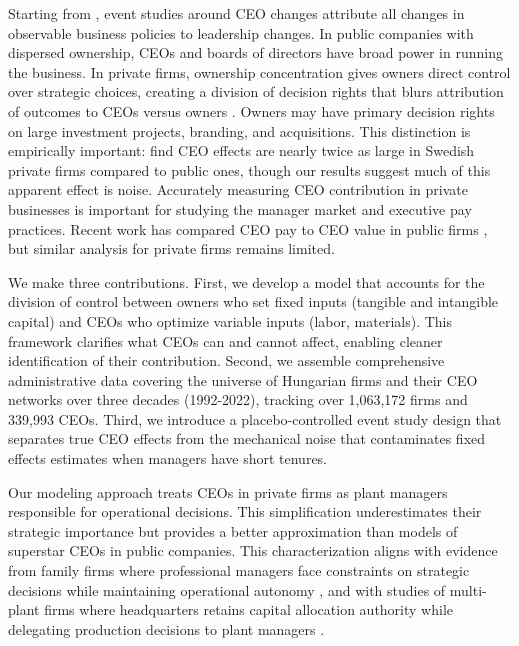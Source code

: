 \documentclass[11pt,a4paper]{article}
\begin{document}
Starting from \citet{Bertrand2003-io}, event studies around CEO changes attribute all changes in observable business policies to leadership changes. In public companies with dispersed ownership, CEOs and boards of directors have broad power in running the business. In private firms, ownership concentration gives owners direct control over strategic choices, creating a division of decision rights that blurs attribution of outcomes to CEOs versus owners \citep{fama1983separation, jensen1976theory, burkart2003family}. Owners may have primary decision rights on large investment projects, branding, and acquisitions. This distinction is empirically important: \citet{quigley2022ceo} find CEO effects are nearly twice as large in Swedish private firms compared to public ones, though our results suggest much of this apparent effect is noise. Accurately measuring CEO contribution in private businesses is important for studying the manager market and executive pay practices. Recent work has compared CEO pay to CEO value in public firms \citep{tervio2008difference,gabaix2008ceo}, but similar analysis for private firms remains limited.

We make three contributions. First, we develop a model that accounts for the division of control between owners who set fixed inputs (tangible and intangible capital) and CEOs who optimize variable inputs (labor, materials). This framework clarifies what CEOs can and cannot affect, enabling cleaner identification of their contribution. Second, we assemble comprehensive administrative data covering the universe of Hungarian firms and their CEO networks over three decades (1992-2022), tracking over 1,063,172 firms and 339,993 CEOs. Third, we introduce a placebo-controlled event study design that separates true CEO effects from the mechanical noise that contaminates fixed effects estimates when managers have short tenures.

Our modeling approach treats CEOs in private firms as plant managers responsible for operational decisions. This simplification underestimates their strategic importance but provides a better approximation than models of superstar CEOs in public companies. This characterization aligns with evidence from family firms where professional managers face constraints on strategic decisions while maintaining operational autonomy \citep{zellweger2012managing}, and with studies of multi-plant firms where headquarters retains capital allocation authority while delegating production decisions to plant managers \citep{bloom2012americans}.
\end{document}
